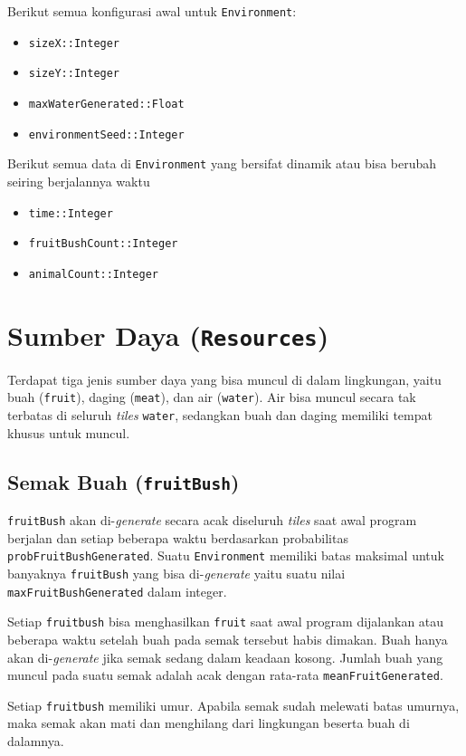 \documentclass[12pt]{article}
\begin{document}
\noindent Berikut semua konfigurasi awal untuk \texttt{Environment}:
\begin{itemize}
    \item \texttt{sizeX::Integer}
    \item \texttt{sizeY::Integer}
    \item \texttt{maxWaterGenerated::Float}
    \item \texttt{environmentSeed::Integer}
\end{itemize}

\noindent Berikut semua data di \texttt{Environment} yang bersifat dinamik atau bisa berubah seiring berjalannya waktu
\begin{itemize}
    \item \texttt{time::Integer}
    \item \texttt{fruitBushCount::Integer}
    \item \texttt{animalCount::Integer}
\end{itemize}
\section{Sumber Daya (\texttt{Resources})}
Terdapat tiga jenis sumber daya yang bisa muncul di dalam lingkungan, yaitu buah (\texttt{fruit}), daging (\texttt{meat}), dan air (\texttt{water}). Air bisa muncul secara tak terbatas di seluruh \textit{tiles} \texttt{water}, sedangkan buah dan daging memiliki tempat khusus untuk muncul.

\subsection{Semak Buah (\texttt{fruitBush})}
\texttt{fruitBush} akan di-\textit{generate} secara acak diseluruh \textit{tiles} saat awal program berjalan dan setiap beberapa waktu berdasarkan probabilitas \texttt{probFruitBushGenerated}. Suatu \texttt{Environment} memiliki batas maksimal untuk banyaknya \texttt{fruitBush} yang bisa di-\textit{generate} yaitu suatu nilai \texttt{maxFruitBushGenerated} dalam integer.

\noindent Setiap \texttt{fruitbush} bisa menghasilkan \texttt{fruit} saat awal program dijalankan atau beberapa waktu setelah buah pada semak tersebut habis dimakan. Buah hanya akan di-\textit{generate} jika semak sedang dalam keadaan kosong. Jumlah buah yang muncul pada suatu semak adalah acak dengan rata-rata \texttt{meanFruitGenerated}.

\noindent Setiap \texttt{fruitbush} memiliki umur. Apabila semak sudah melewati batas umurnya, maka semak akan mati dan menghilang dari lingkungan beserta buah di dalamnya.
\end{document}
